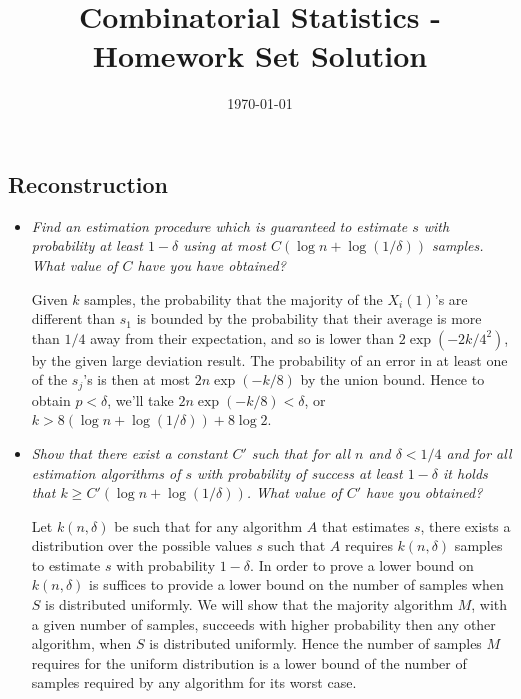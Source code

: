 \documentclass[11pt]{article} \usepackage{amssymb}
\begin{document}
\title{Combinatorial Statistics - Homework Set Solution}

\date{\today}
\maketitle
\subsection{Reconstruction}
\begin{itemize}
\item
{\em Find an estimation procedure which is guaranteed to estimate $s$ with probability at least $1-\delta$ using at most
$C (\log n + \log (1/\delta))$ samples. What value of $C$ have you have obtained?
}

Given $k$ samples, the probability that the majority of  the $X_i(1)$'s are
different than $s_1$ is bounded by the probability that their average is more than
$1/4$ away from their expectation, and so
is lower than $2\exp(-2k/4^2)$, by the given large deviation result.
The probability of an error in at least one of the $s_j$'s is then at most
$2n\exp(-k/8)$ by the union bound. Hence to obtain 
$p<\delta$, we'll take $2n\exp(-k/8)<\delta$, or $k>8\left(\log n+\log(1/\delta)\right)+8\log 2$.

\item
{\em Show that there exist a constant $C'$ such that for all $n$ and $\delta < 1/4$ and for all estimation algorithms of $s$ with
probability of success at least $1-\delta$ it holds that $k \geq C'( \log n + \log (1/\delta))$.
What value of $C'$ have you obtained?
 }

Let $k(n,\delta)$ be 
such that for any algorithm $A$ that estimates $s$, there
exists a distribution over the possible values $s$ such that $A$ requires
$k(n,\delta)$ samples to estimate $s$ with probability $1-\delta$. 
In order to prove a lower bound on $k(n,\delta)$ is suffices to provide a lower bound 
on the number of samples when  $S$ is distributed uniformly. 
We will show that the majority algorithm $M$, with a given number
of samples, succeeds with higher probability then any other algorithm,
when $S$ is distributed
uniformly. Hence the number of samples $M$ requires for the uniform distribution
is a lower bound of the number of samples required by any algorithm for its
worst case.


\end{itemize}
\end{document}
